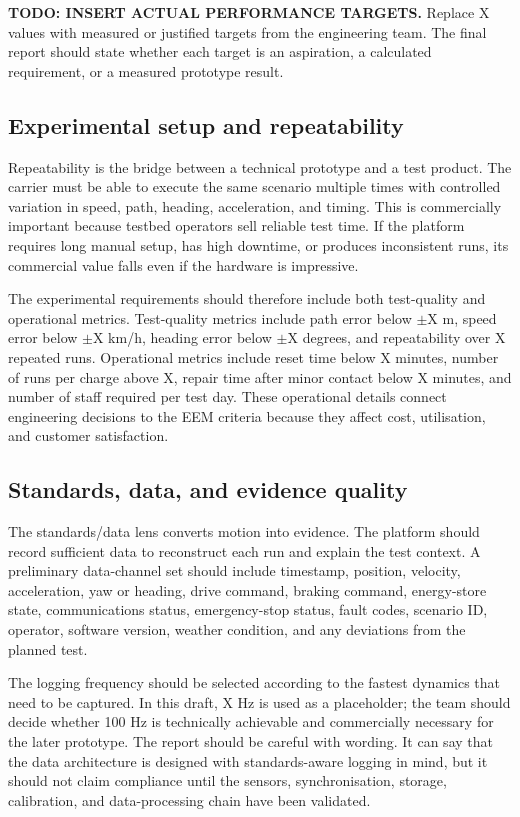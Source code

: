\textbf{TODO: INSERT ACTUAL PERFORMANCE TARGETS.} Replace X values with measured or justified targets from the engineering team. The final report should state whether each target is an aspiration, a calculated requirement, or a measured prototype result.

\subsection{Experimental setup and repeatability}

Repeatability is the bridge between a technical prototype and a test product. The carrier must be able to execute the same scenario multiple times with controlled variation in speed, path, heading, acceleration, and timing. This is commercially important because testbed operators sell reliable test time. If the platform requires long manual setup, has high downtime, or produces inconsistent runs, its commercial value falls even if the hardware is impressive.

The experimental requirements should therefore include both test-quality and operational metrics. Test-quality metrics include path error below $\pm$X m, speed error below $\pm$X km/h, heading error below $\pm$X degrees, and repeatability over X repeated runs. Operational metrics include reset time below X minutes, number of runs per charge above X, repair time after minor contact below X minutes, and number of staff required per test day. These operational details connect engineering decisions to the EEM criteria because they affect cost, utilisation, and customer satisfaction.

\subsection{Standards, data, and evidence quality}

The standards/data lens converts motion into evidence. The platform should record sufficient data to reconstruct each run and explain the test context. A preliminary data-channel set should include timestamp, position, velocity, acceleration, yaw or heading, drive command, braking command, energy-store state, communications status, emergency-stop status, fault codes, scenario ID, operator, software version, weather condition, and any deviations from the planned test.

The logging frequency should be selected according to the fastest dynamics that need to be captured. In this draft, X Hz is used as a placeholder; the team should decide whether 100 Hz is technically achievable and commercially necessary for the later prototype. The report should be careful with wording. It can say that the data architecture is designed with standards-aware logging in mind, but it should not claim compliance until the sensors, synchronisation, storage, calibration, and data-processing chain have been validated.

